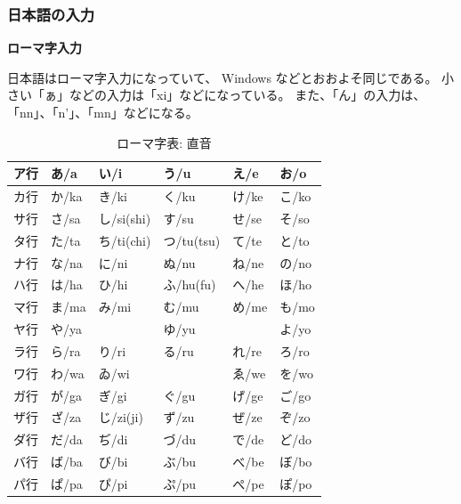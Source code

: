 \subsubsection{日本語の入力}

\textbf{ローマ字入力}
\bigskip

日本語はローマ字入力になっていて、 Windows などとおおよそ同じである。
小さい「ぁ」などの入力は「xi」などになっている。
また、「ん」の入力は、「nn」、「n'」、「mn」などになる。

\begin{table}[H]
\caption{ローマ字表: 直音}
\begin{small}
\begin{center}
\renewcommand{\arraystretch}{1.2}
\begin{tabular}{|l|l|l|l|l|l|}
\hline
ア行 & あ/a & い/i & う/u & え/e & お/o\\
\hline
カ行 & か/ka & き/ki & く/ku & け/ke & こ/ko\\
\hline
サ行 & さ/sa & し/si(shi) & す/su & せ/se & そ/so\\
\hline
タ行 & た/ta & ち/ti(chi) & つ/tu(tsu) & て/te & と/to\\
\hline
ナ行 & な/na & に/ni & ぬ/nu & ね/ne & の/no\\
\hline
ハ行 & は/ha & ひ/hi & ふ/hu(fu) & へ/he & ほ/ho\\
\hline
マ行 & ま/ma & み/mi & む/mu & め/me & も/mo\\
\hline
ヤ行 & や/ya &  & ゆ/yu &  & よ/yo\\
\hline
ラ行 & ら/ra & り/ri & る/ru & れ/re & ろ/ro\\
\hline
ワ行 & わ/wa & ゐ/wi &  & ゑ/we & を/wo\\
\hline
ガ行 & が/ga & ぎ/gi & ぐ/gu & げ/ge & ご/go\\
\hline
ザ行 & ざ/za & じ/zi(ji) & ず/zu & ぜ/ze & ぞ/zo\\
\hline
ダ行 & だ/da & ぢ/di & づ/du & で/de & ど/do\\
\hline
バ行 & ば/ba & び/bi & ぶ/bu & べ/be & ぼ/bo\\
\hline
パ行 & ぱ/pa & ぴ/pi & ぷ/pu & ぺ/pe & ぽ/po\\
\hline
\end{tabular}
\end{center}
\end{small}
\end{table}

